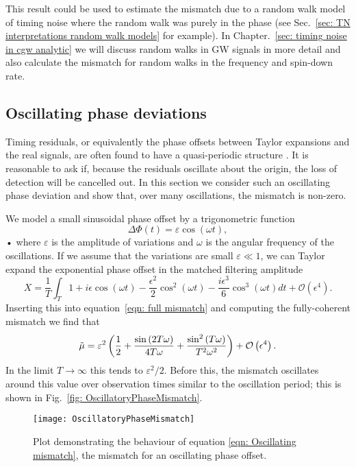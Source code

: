 \documentclass[../full_thesis/full_thesis.tex]{subfiles}
\begin{document}
This result could be used to estimate the mismatch due to a random walk model
of timing noise where the random walk was purely in the phase (see
Sec.~\ref{sec: TN interpretations random walk models} for example). In
Chapter.~\ref{sec: timing noise in cgw analytic} we will discuss random walks
in GW signals in more detail and also calculate the
mismatch for random walks in the frequency and spin-down rate.

\subsection{Oscillating phase deviations}

Timing residuals, or equivalently the phase offsets between Taylor expansions
and the real signals, are often found to have a quasi-periodic structure
\citep{Hobbs2010}. It is reasonable to ask if, because the residuals oscillate
about the origin, the loss of detection will be cancelled out. In this section
we consider such an oscillating phase deviation and show that, over many
oscillations, the mismatch is non-zero.

We model a small sinusoidal phase offset by a trigonometric function
\begin{equation}
\Delta \Phi(t) = \varepsilon \cos(\omega t),
\end{equation}•
where $\varepsilon$ is the amplitude of variations and $\omega$ is the angular
frequency of the oscillations. If we assume that the variations are small
$\varepsilon \ll 1$, we can Taylor expand the exponential phase offset in
the matched filtering amplitude
\begin{equation}
X = \frac{1}{T}\int_{T}
1 + i \epsilon \cos{\left (\omega t \right )}
- \frac{\epsilon^{2}}{2} \cos^{2}{\left (\omega t \right )}
- \frac{i \epsilon^{3}}{6} \cos^{3}{\left (\omega t \right )}
dt
+ \mathcal{O}\left(\epsilon^{4}\right).
\end{equation}
Inserting this into equation~\eqref{eqn: full mismatch} and computing the
fully-coherent mismatch we find that
\begin{equation}
\tilde{\mu} = \varepsilon^{2} \left(\frac{1}{2}
+ \frac{\sin{\left (2 T \omega \right )}}{4 T \omega}
+ \frac{\sin^{2}{\left (T \omega \right )}}{T^{2} \omega^{2}} \right)
+ \mathcal{O}\left(\epsilon^{4}\right).
\label{eqn: Oscillating mismatch}
\end{equation}
In the limit $T \rightarrow \infty$ this tends to $\varepsilon^{2}/2$. Before
this, the mismatch oscillates around this value over observation times similar
to the oscillation period; this is shown in Fig.~\ref{fig:
OscillatoryPhaseMismatch}.
\begin{figure}[ht]
\centering
\texttt{[image: OscillatoryPhaseMismatch]}
\caption{Plot demonstrating the behaviour of equation
         \eqref{eqn: Oscillating mismatch}, the mismatch for an oscillating
         phase offset.}
\label{fig: OscillatoryPhaseMismatch}
\end{figure}
\end{document}
